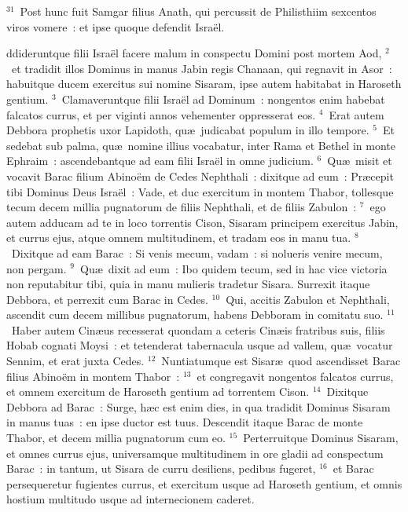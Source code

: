 ${}^{31}$~Post hunc fuit Samgar filius Anath, qui percussit de Philisthiim sexcentos viros vomere~: et ipse quoque defendit Isra\"el.

\bchapter
{}ddideruntque filii Isra\"el facere malum in conspectu Domini post mortem Aod,
${}^{2}$~et tradidit illos Dominus in manus Jabin regis Chanaan, qui regnavit in Asor~: habuitque ducem exercitus sui nomine Sisaram, ipse autem habitabat in Haroseth gentium.
${}^{3}$~Clamaveruntque filii Isra\"el ad Dominum~: nongentos enim habebat falcatos currus, et per viginti annos vehementer oppresserat eos.
${}^{4}$~Erat autem Debbora prophetis uxor Lapidoth, qu\ae\ judicabat populum in illo tempore.
${}^{5}$~Et sedebat sub palma, qu\ae\ nomine illius vocabatur, inter Rama et Bethel in monte Ephraim~: ascendebantque ad eam filii Isra\"el in omne judicium.
${}^{6}$~Qu\ae\ misit et vocavit Barac filium Abino\"em de Cedes Nephthali~: dixitque ad eum~: Pr\ae cepit tibi Dominus Deus Isra\"el~: Vade, et duc exercitum in montem Thabor, tollesque tecum decem millia pugnatorum de filiis Nephthali, et de filiis Zabulon~:
${}^{7}$~ego autem adducam ad te in loco torrentis Cison, Sisaram principem exercitus Jabin, et currus ejus, atque omnem multitudinem, et tradam eos in manu tua.
${}^{8}$~Dixitque ad eam Barac~: Si venis mecum, vadam~: si nolueris venire mecum, non pergam.
${}^{9}$~Qu\ae\ dixit ad eum~: Ibo quidem tecum, sed in hac vice victoria non reputabitur tibi, quia in manu mulieris tradetur Sisara. Surrexit itaque Debbora, et perrexit cum Barac in Cedes.
${}^{10}$~Qui, accitis Zabulon et Nephthali, ascendit cum decem millibus pugnatorum, habens Debboram in comitatu suo.
${}^{11}$~Haber autem Cin\ae us recesserat quondam a ceteris Cin\ae is fratribus suis, filiis Hobab cognati Moysi~: et tetenderat tabernacula usque ad vallem, qu\ae\ vocatur Sennim, et erat juxta Cedes.
${}^{12}$~Nuntiatumque est Sisar\ae\ quod ascendisset Barac filius Abino\"em in montem Thabor~:
${}^{13}$~et congregavit nongentos falcatos currus, et omnem exercitum de Haroseth gentium ad torrentem Cison.
${}^{14}$~Dixitque Debbora ad Barac~: Surge, h\ae c est enim dies, in qua tradidit Dominus Sisaram in manus tuas~: en ipse ductor est tuus. Descendit itaque Barac de monte Thabor, et decem millia pugnatorum cum eo.
${}^{15}$~Perterruitque Dominus Sisaram, et omnes currus ejus, universamque multitudinem in ore gladii ad conspectum Barac~: in tantum, ut Sisara de curru desiliens, pedibus fugeret,
${}^{16}$~et Barac persequeretur fugientes currus, et exercitum usque ad Haroseth gentium, et omnis hostium multitudo usque ad internecionem caderet.


